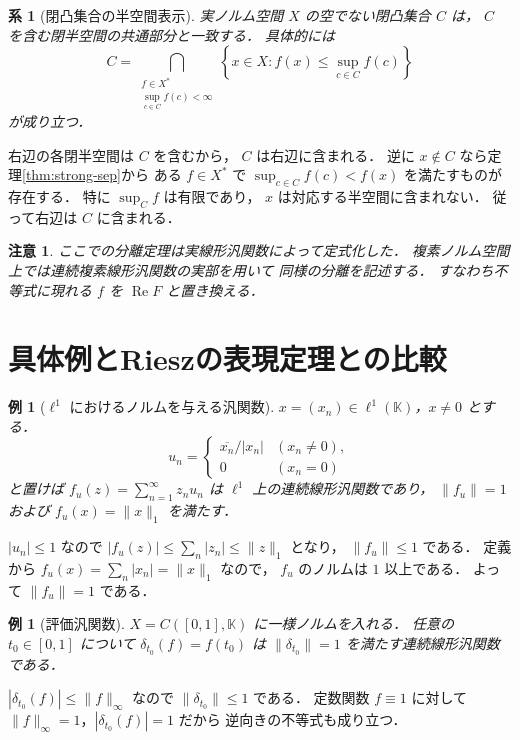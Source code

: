 \documentclass[a5paper,10pt,onecolumn]{jsarticle}
\makeatletter
\theoremstyle{mathnotetheorem}
\newtheorem{corollary}[theorem]{系}
\newtheorem{example}[theorem]{例}
\newtheorem{remark}[theorem]{注意}
\renewcommand{\proofname}{証明}
\renewenvironment{proof}[1][\proofname]{%
  \par\pushQED{\qed}\normalfont\topsep4\p@\@plus2\p@\relax
  \trivlist\item[\hskip\labelsep\bfseries #1]\ignorespaces
}{\popQED\endtrivlist\@endpefalse}
\makeatother
\begin{document}
\begin{corollary}[閉凸集合の半空間表示]\label{cor:halfspaces}
実ノルム空間 $X$ の空でない閉凸集合 $C$ は，
$C$ を含む閉半空間の共通部分と一致する．
具体的には
\[
 C=\bigcap_{\substack{f\in X^*\\
       \sup_{c\in C}f(c)<\infty}}
 \left\{x\in X:
 f(x)\le \sup_{c\in C}f(c)\right\}
\]
が成り立つ．
\end{corollary}
\begin{proof}
右辺の各閉半空間は $C$ を含むから，
$C$ は右辺に含まれる．
逆に $x\notin C$ なら定理\ref{thm:strong-sep}から
ある $f\in X^*$ で
$\sup_{c\in C}f(c)<f(x)$ を満たすものが存在する．
特に $\sup_Cf$ は有限であり，
$x$ は対応する半空間に含まれない．
従って右辺は $C$ に含まれる．
\end{proof}

\begin{remark}
ここでの分離定理は実線形汎関数によって定式化した．
複素ノルム空間上では連続複素線形汎関数の実部を用いて
同様の分離を記述する．
すなわち不等式に現れる $f$ を
$\operatorname{Re}F$ と置き換える．
\end{remark}

\section{具体例とRieszの表現定理との比較}

\begin{example}[$\ell^1$ におけるノルムを与える汎関数]
$x=(x_n)\in\ell^1(\mathbb K)$，$x\ne0$ とする．
\[
 u_n=
 \begin{cases}
 \overline{x_n}/|x_n|& (x_n\ne0),\\
 0&(x_n=0)
 \end{cases}
\]
と置けば
$f_u(z)=\sum_{n=1}^\infty z_nu_n$ は
$\ell^1$ 上の連続線形汎関数であり，
$\|f_u\|=1$ および $f_u(x)=\|x\|_1$ を満たす．
\end{example}
\begin{proof}
$|u_n|\le1$ なので
$|f_u(z)|\le\sum_n|z_n|\le\|z\|_1$ となり，
$\|f_u\|\le1$ である．
定義から
$f_u(x)=\sum_n|x_n|=\|x\|_1$ なので，
$f_u$ のノルムは $1$ 以上である．
よって $\|f_u\|=1$ である．
\end{proof}

\begin{example}[評価汎関数]
$X=C([0,1],\mathbb K)$ に一様ノルムを入れる．
任意の $t_0\in[0,1]$ について
$\delta_{t_0}(f)=f(t_0)$ は
$\|\delta_{t_0}\|=1$ を満たす連続線形汎関数である．
\end{example}
\begin{proof}
$|\delta_{t_0}(f)|\le\|f\|_\infty$ なので
$\|\delta_{t_0}\|\le1$ である．
定数関数 $f\equiv1$ に対して
$\|f\|_\infty=1$，$|\delta_{t_0}(f)|=1$ だから
逆向きの不等式も成り立つ．
\end{proof}
\end{document}
